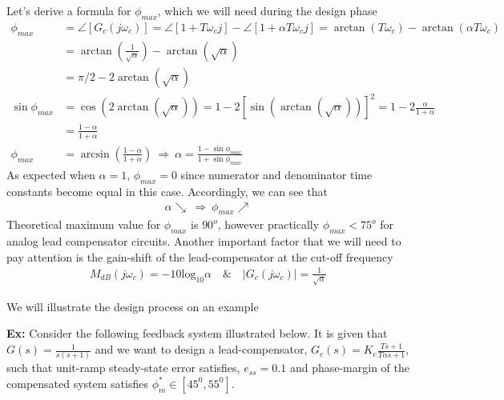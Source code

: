 \documentclass[twoside]{article}
\begin{document}
Let's derive a formula for $\phi_{max}$, which we will need during the 
design phase
%
\begin{align*}
    \phi_{max} &= \angle [ G_c( j \omega_c) ] = \angle \left[ 1 + T
  \omega_c j \right] - \angle \left[ 1 + \alpha T
  \omega_c j \right] = \arctan(T \omega_c) - \arctan(\alpha  T \omega_c)
  \\
  &= \arctan \left( \frac{1}{\sqrt{\alpha}}  \right) - \arctan \left(
    \sqrt{\alpha} \right) 
    \\
  &= \pi/2 - 2 \arctan \left( \sqrt{\alpha} \right)
\\
\sin \phi_{max} &=  \cos \left( 2 \arctan \left( \sqrt{\alpha} \right)
                  \right)
                  = 1 - 2 \left[ \sin\left( \arctan \left( \sqrt{\alpha} \right)
                  \right) \right]^2 = 1 - 2 \frac{\alpha}{1 + \alpha}
                  \\
&= \frac{1 - \alpha}{1 + \alpha}
  \\
    \phi_{max} &= \arcsin \left( \frac{1 - \alpha}{1 + \alpha} \right)
        \         \Rightarrow \ \alpha = \frac{1 - \sin \phi_{max}}{1
                 + \sin \phi_{max}}
\end{align*}
%
As expected when $\alpha = 1$, $\phi_{max} = 0$ since numerator 
and denominator time constants become equal in this
case. Accordingly, we can see that 
%
\begin{align*}
  \alpha \searrow \ \Rightarrow \ \phi_{max} \nearrow
\end{align*}
%
Theoretical maximum value for $\phi_{max}$ is $90^o$,
however practically $\phi_{max} < 75^o$ for analog 
lead compensator circuits. Another important factor that 
we will need to pay attention is the gain-shift of
the lead-compensator at the cut-off frequency 
%
\begin{align*}
  M_{dB}(j \omega_c) = -10 \mathrm{log}_{10} \alpha \quad \& \quad
  | G_c(j \omega_c) | = \frac{1}{\sqrt{\alpha}}
\end{align*}
%

We will illustrate the design process on an example 

\vspace{6pt}

\textbf{Ex:} Consider the following feedback system illustrated below.
It is given that $G(s) = \frac{1}{s (s+1)}$ and we want to
design a lead-compensator, $G_c(s) = K_c \frac{T s + 1}{T \alpha s +
  1}$, such that unit-ramp steady-state error satisfies, $e_{ss} = 0.1$ and phase-margin of the compensated system satisfies $\phi_m^* \in
\left[ 45^0 , 55^0 \right]$. 
\end{document}
